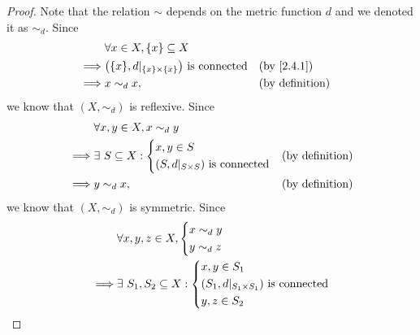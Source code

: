 \begin{proof}
  Note that the relation \(\sim\) depends on the metric function \(d\) and we denoted it as \(\sim_d\).
  Since
  \begin{align*}
             & \forall x \in X, \{x\} \subseteq X                                                          \\
    \implies & \big(\{x\}, d|_{\{x\} \times \{x\}}\big) \text{ is connected} &  & \text{(by \cref{2.4.1})} \\
    \implies & x \sim_d x,                                                   &  & \text{(by definition)}
  \end{align*}
  we know that \((X, \sim_d)\) is reflexive.
  Since
  \begin{align*}
             & \forall x, y \in X, x \sim_d y                                        \\
    \implies & \exists\ S \subseteq X : \begin{dcases}
                                          x, y \in S \\
                                          (S, d|_{S \times S}) \text{ is connected}
                                        \end{dcases} &  & \text{(by definition)}     \\
    \implies & y \sim_d x,                               &  & \text{(by definition)}
  \end{align*}
  we know that \((X, \sim_d)\) is symmetric.
  Since
  \begin{align*}
             & \forall x, y, z \in X, \begin{dcases}
                                        x \sim_d y \\
                                        y \sim_d z
                                      \end{dcases}                                                                                                          \\
    \implies & \exists\ S_1, S_2 \subseteq X : \begin{dcases}
                                                 x, y \in S_1                                    \\
                                                 (S_1, d|_{S_1 \times S_1}) \text{ is connected} \\
                                                 y, z \in S_2                                    \\

\end{dcases}
\end{align*}
\end{proof}
